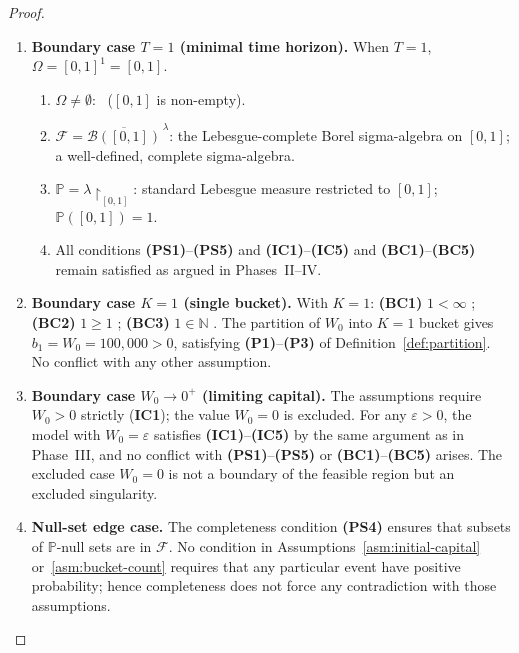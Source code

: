 \documentclass[12pt,openany]{book}
\newcommand{\calF}{\mathcal{F}}
\newcommand{\Prob}{\mathbb{P}}
\numberwithin{equation}{chapter}
\theoremstyle{plain}
\theoremstyle{definition}
\theoremstyle{remark}
\numberwithin{equation}{chapter}
\theoremstyle{plain}
\begin{document}
\begin{proof}
\begin{enumerate}[label=\textbf{Phase~\Roman*.}]
\begin{enumerate}[label=\textbf{Step~6.\arabic*.}]

  \item \textbf{Boundary case $T = 1$ (minimal time horizon).}
        When $T = 1$, $\Omega = [0,1]^1 = [0,1]$.
        \begin{enumerate}[label=\textbf{(6.1.\alph*)}]
          \item $\Omega \neq \emptyset$: \checkmark\
                ($[0,1]$ is non-empty).
          \item $\calF = \overline{\mathcal{B}([0,1])}^{\,\lambda}$:
                the Lebesgue-complete Borel sigma-algebra on $[0,1]$;
                a well-defined, complete sigma-algebra.
                \checkmark
          \item $\Prob = \lambda\!\restriction_{[0,1]}$:
                standard Lebesgue measure restricted to $[0,1]$;
                $\Prob([0,1]) = 1$.  \checkmark
          \item All conditions \textbf{(PS1)}--\textbf{(PS5)} and
                \textbf{(IC1)}--\textbf{(IC5)} and
                \textbf{(BC1)}--\textbf{(BC5)} remain satisfied as
                argued in Phases~II--IV.  \checkmark
        \end{enumerate}

  \item \textbf{Boundary case $K = 1$ (single bucket).}
        With $K = 1$: \textbf{(BC1)} $1 < \infty$ \checkmark;
        \textbf{(BC2)} $1 \geq 1$ \checkmark;
        \textbf{(BC3)} $1 \in \mathbb{N}$ \checkmark.
        The partition of $W_0$ into $K = 1$ bucket gives
        $b_1 = W_0 = 100{,}000 > 0$, satisfying
        \textbf{(P1)}--\textbf{(P3)} of Definition~\ref{def:partition}.
        No conflict with any other assumption.  \checkmark

  \item \textbf{Boundary case $W_0 \to 0^+$ (limiting capital).}
        The assumptions require $W_0 > 0$ strictly
        (\textbf{IC1}); the value $W_0 = 0$ is excluded.  For any
        $\varepsilon > 0$, the model with $W_0 = \varepsilon$
        satisfies \textbf{(IC1)}--\textbf{(IC5)} by the same
        argument as in Phase~III, and no conflict with
        \textbf{(PS1)}--\textbf{(PS5)} or \textbf{(BC1)}--\textbf{(BC5)}
        arises.  The excluded case $W_0 = 0$ is not a boundary of
        the feasible region but an excluded singularity.  \checkmark

  \item \textbf{Null-set edge case.}
        The completeness condition \textbf{(PS4)} ensures that
        subsets of $\Prob$-null sets are in $\calF$.  No condition
        in Assumptions~\ref{asm:initial-capital}
        or~\ref{asm:bucket-count} requires that any particular event
        have positive probability; hence completeness does not force
        any contradiction with those assumptions.  \checkmark


\end{enumerate}
\end{enumerate}
\end{proof}
\end{document}
